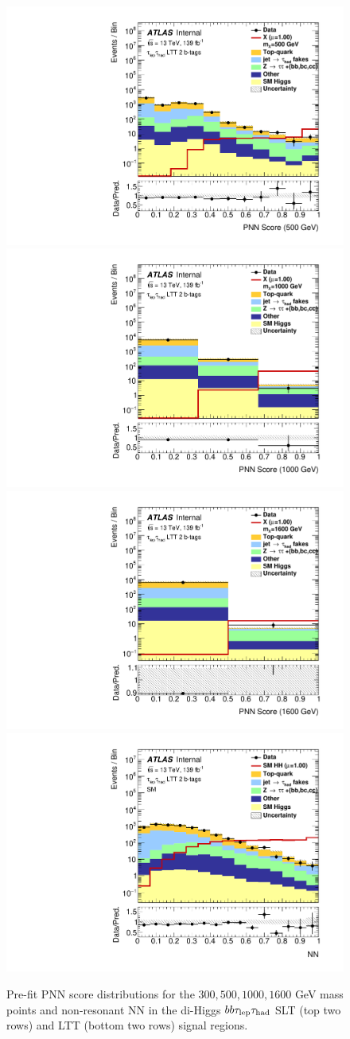 \begin{figure}
\includegraphics[width=.32\textwidth]{diHiggs/plots/MVA/LTT/Region_BMin0_incJet1_dist500_J2_D2HDMPNN_T2_SpcTauLH_Y2015_LTT1_L1_Prefitlog.pdf}
\includegraphics[width=.32\textwidth]{diHiggs/plots/MVA/LTT/Region_BMin0_incJet1_dist1000_J2_D2HDMPNN_T2_SpcTauLH_Y2015_LTT1_L1_Prefitlog.pdf} \\
\includegraphics[width=.32\textwidth]{diHiggs/plots/MVA/LTT/Region_BMin0_incJet1_dist1600_J2_D2HDMPNN_T2_SpcTauLH_Y2015_LTT1_L1_Prefitlog.pdf} 
\includegraphics[width=.32\textwidth]{diHiggs/plots/MVA/LTT/Region_BMin0_incJet1_distNN_J2_DSM_T2_SpcTauLH_Y2015_LTT1_L1_Prefitlog.pdf}
\caption{Pre-fit PNN score distributions for the $300, 500, 1000, 1600$ GeV mass points and 
non-resonant NN in the di-Higgs $bb\tau_{\mathrm{lep}}\tau_{\mathrm{had}}$ SLT (top two rows) and LTT (bottom two rows) signal regions.}
\label{fig:lephadmvaoutput}
\end{figure}
  




